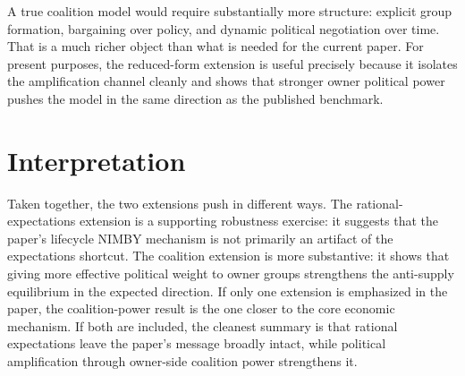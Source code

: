 \documentclass[11pt]{article}
\begin{document}
A true coalition model would require substantially more structure: explicit group formation,
bargaining over policy, and dynamic political negotiation over time. That is a much richer object
than what is needed for the current paper. For present purposes, the reduced-form extension is
useful precisely because it isolates the amplification channel cleanly and shows that stronger owner
political power pushes the model in the same direction as the published benchmark.

\section{Interpretation}

Taken together, the two extensions push in different ways. The rational-expectations extension is a
supporting robustness exercise: it suggests that the paper's lifecycle NIMBY mechanism is not
primarily an artifact of the expectations shortcut. The coalition extension is more substantive: it
shows that giving more effective political weight to owner groups strengthens the anti-supply
equilibrium in the expected direction. If only one extension is emphasized in the paper, the
coalition-power result is the one closer to the core economic mechanism. If both are included, the
cleanest summary is that rational expectations leave the paper's message broadly intact, while
political amplification through owner-side coalition power strengthens it.
\end{document}
